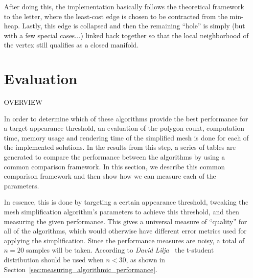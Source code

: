 After doing this, the implementation basically follows the theoretical framework to the letter, where the least-cost edge is chosen to be contracted from the min-heap. Lastly, this edge is collapsed and then the remaining ``hole'' is simply (but with a few special cases...) linked back together so that the local neighborhood of the vertex still qualifies as a closed manifold.

\section{Evaluation} \label{sec:evaluation}
OVERVIEW

\iffalse
In order to determine which of these algorithms provide the best performance for a target appearance threshold, an evaluation of the polygon count, computation time, memory usage and rendering time of the simplified mesh is done for each of the implemented solutions. In the results from this step, a series of tables are generated to compare the performance between the algorithms by using a common comparison framework. In this section, we describe this common comparison framework and then show how we can measure each of the parameters.

In essence, this is done by targeting a certain appearance threshold, tweaking the mesh simplification algorithm's parameters to achieve this threshold, and then measuring the given performance. This gives a universal measure of ``quality'' for all of the algorithms, which would otherwise have different error metrics used for applying the simplification. Since the performance measures are noisy, a total of \(n=20\) samples will be taken. According to \emph{David Lilja}~\cite[p.~50]{lilja2005measuring} the t-student distribution should be used when \(n < 30\), as shown in Section~\ref{sec:measuring_algorithmic_performance}.

